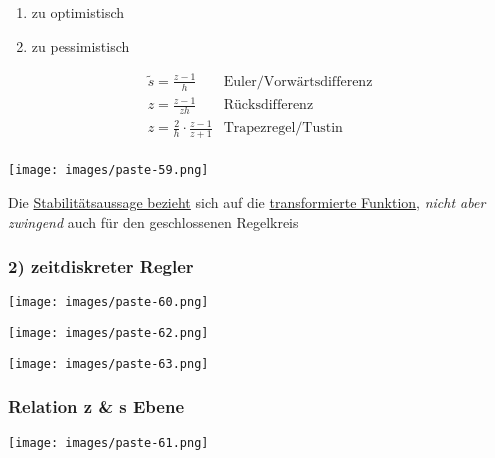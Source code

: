 \documentclass[
  10pt,
  a4paper,
  twocolumn]{article}
\providecommand{\tightlist}{%
  \setlength{\itemsep}{0pt}\setlength{\parskip}{0pt}}\usepackage{longtable,booktabs,array}
\numberwithin{equation}{section}
\begin{document}
\small

\begin{enumerate}
\def\labelenumi{\arabic{enumi}.}
\tightlist
\item
  zu optimistisch
\item
  zu pessimistisch
\end{enumerate}

\normalsize

\[
\begin{array}{ll}
  \widetilde{s} = \frac{z-1}{h} & \text{Euler/Vorwärtsdifferenz} \\
  z = \frac{z-1}{zh} & \text{Rücksdifferenz} \\
  z = \frac{2}{h}\cdot\frac{z-1}{z+1} & \text{Trapezregel/Tustin} \\
\end{array}
\]

\texttt{[image: images/paste-59.png]}

\begin{tcolorbox}[enhanced jigsaw, coltitle=black, colback=white, breakable, colframe=quarto-callout-tip-color-frame, rightrule=.15mm, left=2mm, opacityback=0, leftrule=.75mm, toptitle=1mm, colbacktitle=quarto-callout-tip-color!10!white, bottomtitle=1mm, arc=.35mm, bottomrule=.15mm, title=\textcolor{quarto-callout-tip-color}{\faLightbulb}\hspace{0.5em}{Stabilität}, titlerule=0mm, toprule=.15mm, opacitybacktitle=0.6]

Die \ul{Stabilitätsaussage bezieht} sich auf die \ul{transformierte
Funktion}, \emph{nicht aber zwingend} auch für den geschlossenen
Regelkreis

\end{tcolorbox}

\subsubsection{2) zeitdiskreter Regler}\label{zeitdiskreter-regler}

\texttt{[image: images/paste-60.png]}

\texttt{[image: images/paste-62.png]}

\texttt{[image: images/paste-63.png]}

\subsubsection{Relation z \& s Ebene}\label{relation-z-s-ebene}

\texttt{[image: images/paste-61.png]}
\end{document}
